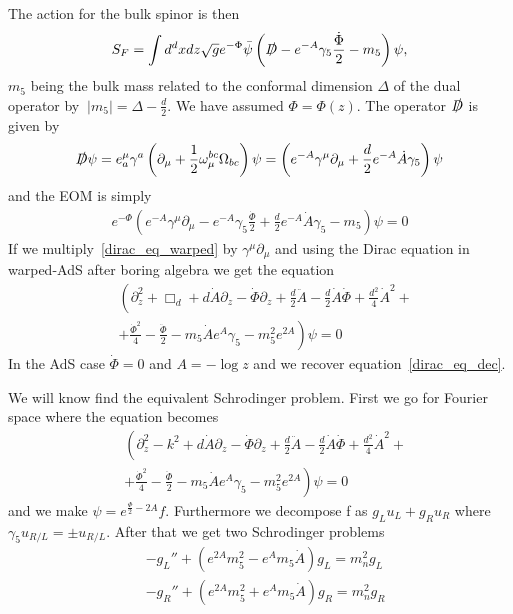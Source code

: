 \documentclass[12pt,a4paper]{article}
\begin{document}
The action for the bulk spinor is then
\begin{align}
    S_F = \int d^d x dz \sqrt{g} e^{-\Phi} \bar{\psi} \left( \slashed{D} - e^{-A} \gamma_5 \frac{\dot{\Phi}}{2} - m_5  \right) \psi,
\end{align}
$m_5$ being the bulk mass related to the conformal dimension $\Delta$ of the dual operator by $\
|m_5| = \Delta - \frac{d}{2}$. We have assumed $\Phi = \Phi\left(z\right)$.
The operator $\slashed{D}$ is given by
\begin{align}
    \slashed{D} \psi = e^{\mu}_a \gamma^a \left( \partial_\mu + \frac{1}{2} \omega_\mu^{bc} \Omega_{bc} \right) \psi = \left( e^{-A} \gamma^{\mu} \partial_\mu + \frac{d}{2} e^{-A} \dot{A} \gamma_5 \right)\psi
\end{align}
and the EOM is simply
\begin{align}
    e^{-\Phi}\left( e^{-A} \gamma^{\mu} \partial_\mu -e^{-A} \gamma_5 \frac{\dot{\Phi}}{2}+ \frac{d}{2} e^{-A} \dot{A} \gamma_5 - m_5 \right)\psi = 0
\label{dirac_eq_warped}
\end{align}
If we multiply~\ref{dirac_eq_warped} by $\gamma^{\mu}\partial_\mu$ and using the Dirac equation in warped-AdS after boring algebra we get the equation
\begin{align}
    & \left( \partial_z^2 + \Box_d + d \dot{A} \partial_z -\dot{\Phi} \partial_z  + \frac{d}{2} \ddot{A} - \frac{d}{2} \dot{A}\dot{\Phi}+\frac{d^2}{4} \dot{A}^2 + \right. \\
    & \left. + \frac{\dot{\Phi}^2}{4} - \frac{\ddot{\Phi}}{2} - m_5 \dot{A} e^{A} \gamma_5 - m_5^2 e^{2A}\right) \psi = 0
\end{align}
In the AdS case $\dot{\Phi} = 0$ and $A = -\log z$ and we recover equation~\ref{dirac_eq_dec}.

We will know find the equivalent Schrodinger problem. First we go for Fourier space where the equation becomes
\begin{align}
    & \left( \partial_z^2 -k ^2 + d \dot{A} \partial_z -\dot{\Phi} \partial_z  + \frac{d}{2} \ddot{A} - \frac{d}{2} \dot{A}\dot{\Phi}+\frac{d^2}{4} \dot{A}^2 + \right. \\
    & \left. + \frac{\dot{\Phi}^2}{4} - \frac{\ddot{\Phi}}{2} - m_5 \dot{A} e^{A} \gamma_5 - m_5^2 e^{2A}\right) \psi = 0
\end{align}
and we make $\psi = e^{\frac{\Phi}{2} - 2A} f$. Furthermore we decompose f as $g_L u_L + g_R u_R$ where $\gamma_5 u_{R/L} = \pm u_{R/L}$. After that we get two Schrodinger problems
\begin{align}
    \label{left_schrodinger_problem}
    &- g_L'' + \left( e^{2A} m_5^2 - e^{A} m_5 \dot{A} \right)g_L = m_n^2 g_L \\
    \label{right_schrodinger_problem}
    &- g_R'' + \left( e^{2A} m_5^2 + e^{A} m_5 \dot{A} \right)g_R = m_n^2 g_R
\end{align}
\end{document}
